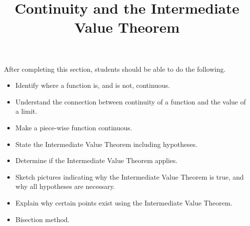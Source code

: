 \documentclass{ximera}
\title{Continuity and the Intermediate Value Theorem}
\begin{document}
\begin{abstract}
\end{abstract}

\maketitle

\begin{sectionOutcomes}
After completing this section, students should be able to do the following.

\begin{itemize}
\item Identify where a function is, and is not, continuous.
\item Understand the connection between continuity of a function and
  the value of a limit.
\item Make a piece-wise function continuous.
\item State the Intermediate Value Theorem including hypotheses.
\item Determine if the Intermediate Value Theorem applies.
\item Sketch pictures indicating why the Intermediate Value Theorem is
  true, and why all hypotheses are necessary.
\item Explain why certain points exist using the Intermediate Value
  Theorem.
\item Bisection method.
\end{itemize}

\end{sectionOutcomes}
\end{document}

